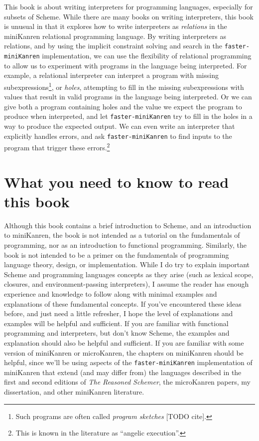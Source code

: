 \documentclass{book}
\begin{document}
This book is about writing interpreters for programming languages, especially for subsets of Scheme.
While there are many books on writing interpreters, this book is unusual in that it explores
how to write interpreters as \emph{relations} in the miniKanren relational programming language.
By writing interpreters as relations, and by using the implicit constraint solving and search in the \texttt{faster-miniKanren} implementation, we can use the flexibility of relational programming to allow us to experiment with programs in the language being interpreted.  For example, a relational interpreter can interpret a program with missing subexpressions\footnote{Such programs are often called \emph{program sketches} [TODO cite].}, or \emph{holes}, attempting to fill in the missing subexpressions with values that result in valid programs in the language being interpreted.  Or we can give both a program containing holes and the value we expect the program to produce when interpreted, and let \texttt{faster-miniKanren} try to fill in the holes in a way to produce the expected output.  We can even write an interpreter that explicitly handles errors, and ask \texttt{faster-miniKanren} to find inputs to the program that trigger these errors.\footnote{This is known in the literature as ``angelic execution''.}

\section{What you need to know to read this book}

Although this book contains a brief introduction to Scheme, and an introduction to miniKanren, the book is not intended as a tutorial on the fundamentals of programming, nor as an introduction to functional programming.  Similarly, the book is not intended to be a primer on the fundamentals of programming language theory, design, or implementation.  While I do try to explain important Scheme and programming languages concepts as they arise (such as lexical scope, closures, and environment-passing interpreters), I assume the reader has enough experience and knowledge to follow along with minimal examples and explanations of these fundamental concepts.  If you've encountered these ideas before, and just need a little refresher, I hope the level of explanations and examples will be helpful and sufficient.  If you are familiar with functional programming and interpreters, but don't know Scheme, the examples and explanation should also be helpful and sufficient.  If you are familiar with some version of miniKanren or microKanren, the chapters on miniKanren should be helpful, since we'll be using aspects of the \texttt{faster-miniKanren} implementation of miniKanren that extend (and may  differ from) the languages described in the first and second editions of \emph{The Reasoned Schemer}, the microKanren papers, my dissertation, and other miniKanren literature.
\end{document}
